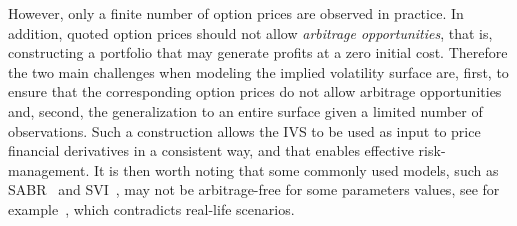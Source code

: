 However, only a finite number of option prices are observed in practice.
In addition, quoted option prices should not allow \textit{arbitrage opportunities}, that is, constructing a portfolio that may generate profits at a zero initial cost.
Therefore the two main challenges when modeling the implied volatility surface are, first, to ensure that the corresponding option prices do not allow arbitrage opportunities and, second, the generalization to an entire surface given a limited number of observations.
Such a construction allows the IVS to be used as input to price financial derivatives in a consistent way, and that enables effective risk-management.
It is then worth noting that some commonly used models, such as SABR~\cite{hagan2002managing} and SVI~\cite{gatheral2004parsimonious}, may not be arbitrage-free for some parameters values, see for example~\cite[Section~3]{roper2010arbitrage}, which contradicts real-life scenarios.



